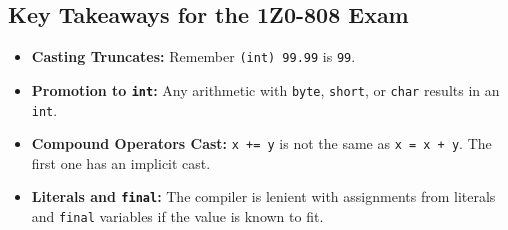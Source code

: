 \documentclass[12pt]{article}
\begin{document}
\begin{enumerate}[label=(\arabic*)]
\section*{Key Takeaways for the 1Z0-808 Exam}
\begin{itemize}
\item \textbf{Casting Truncates:} Remember \texttt{(int) 99.99} is \texttt{99}.
\item \textbf{Promotion to \texttt{int}:} Any arithmetic with \texttt{byte}, \texttt{short}, or \texttt{char} results in an \texttt{int}.
\item \textbf{Compound Operators Cast:} \texttt{x += y} is not the same as \texttt{x = x + y}. The first one has an implicit cast.
\item \textbf{Literals and \texttt{final}:} The compiler is lenient with assignments from literals and \texttt{final} variables if the value is known to fit.
\end{itemize}
\end{enumerate}
\end{document}
